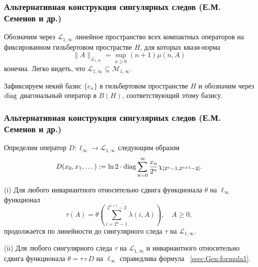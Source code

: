 \begin{frame}\frametitle{Альтернативная конструкция сингулярных следов (Е.М. Семенов и др.)}

	Обозначим через $\mathcal L_{1,\infty}$ линейное пространство всех компактных операторов на фиксированном гильбертовом прострастве $H$, для которых квази-норма
	$$\|A\|_{\mathcal L_{1,\infty}} = \sup_{n \ge 0} (n+1) \mu(n,A)$$
	конечна. Легко видеть, что $\mathcal L_{1,\infty} \subsetneq \mathcal M_{1,\infty}$.

	\vfill

	Зафиксируем некий базис $\{e_n\}$ в гильбертовом пространстве $H$ и обозначим через ${\rm diag}$ диагональный оператор в $B(H)$, соответствующий этому базису.

\end{frame}

\begin{frame}\frametitle{Альтернативная конструкция сингулярных следов (Е.М. Семенов и др.)}

	Определим оператор $D: \ell_\infty \to \mathcal L_{1,\infty}$ следующим образом
	\begin{align*}
	D(x_0, x_1, \dots) := \ln 2 \cdot {\rm diag} \sum_{n=0}^\infty \frac{x_n}{2^n} \chi_{[2^n-1,2^{n+1}-2]}.
	\end{align*}

	\begin{ttheorem}
		(i) Для любого инвариантного относительно сдвига функционала $\theta$ на $\ell_\infty$ функционал
	\begin{equation}\label{ssec:Gen:formula1}
	\tau(A) = \theta\left(\sum_{i=2^n-1}^{2^{n+1}-2} \lambda(i,A) \right) , \quad A\ge0,
	\end{equation}
	продолжается по линейности до сингулярного следа $\tau$ на $\mathcal L_{1,\infty}$.

	(ii) Для любого сингулярного следа $\tau$ на $\mathcal L_{1,\infty}$ и инвариантного относительно сдвига функционала $\theta=\tau\circ D$ на $\ell_\infty$ справедлива формула ~\eqref{ssec:Gen:formula1}.
	\end{ttheorem}

\end{frame}



